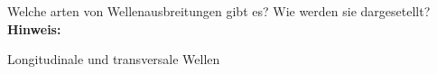 \begin{question}[section=5,subsection=52,name={Wellenausbreitungsphänomene},difficulty=6,type=mdl,mode=exm,tags={}]
	Welche arten von Wellenausbreitungen gibt es? Wie werden sie dargesetellt?
	\\ \textbf{Hinweis:}\\
	
\end{question}
\begin{solution}
	Longitudinale und transversale Wellen
\end{solution}